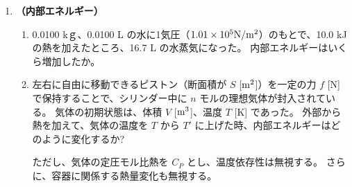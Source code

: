 \documentclass[uplatex,dvipdfmx,a4paper,11pt]{jsarticle}
\begin{document}
\begin{enumerate}
\begin{enumerate}
\end{enumerate}


\item
{\bf （内部エネルギー）}

\begin{enumerate}
\item
0.0100 kｇ、0.0100 L の水に1気圧（$1.01 \times 10^5 {\rm N}/{\rm m}^2$）のもとで、10.0 kJ の熱を加えたところ、16.7 L の水蒸気になった。
内部エネルギーはいくら増加したか。

%

\item
左右に自由に移動できるピストン（断面積が $S$ [${\rm m}^2$]）を一定の力 $f$ [N] で保持することで、シリンダー中に $n$ モルの理想気体が封入されている。
気体の初期状態は、体積 $V$ [${\rm m}^3$]、温度 $T$ [K] であった。
外部から熱を加えて、気体の温度を $T$ から $T'$ に上げた時、内部エネルギーはどのように変化するか?

ただし、気体の定圧モル比熱を $C_P$ とし、温度依存性は無視する。
さらに、容器に関係する熱量変化も無視する。

%
%

\end{enumerate}


\end{enumerate}
\end{document}
